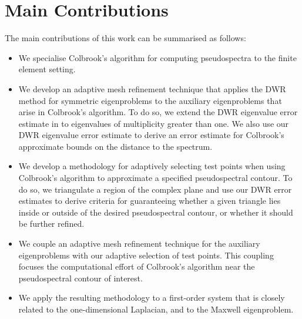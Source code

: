 \section{Main Contributions}

The main contributions of this work can be summarised as follows:

\begin{itemize}
    \item We specialise Colbrook's algorithm for computing pseudospectra to the finite element setting. 
    \item We develop an adaptive mesh refinement technique that applies the DWR method for symmetric eigenproblems to the auxiliary eigenproblems that arise in Colbrook's algorithm. To do so, we extend the  DWR eigenvalue error estimate in \cite{Bangerth, Heuveline} to eigenvalues of multiplicity greater than one.  We also use our DWR eigenvalue error estimate to derive an error estimate for Colbrook's approximate bounds on the distance to the spectrum.
    \item We develop a methodology for adaptively selecting test points when using Colbrook's algorithm to approximate a specified pseudospectral contour. To do so, we triangulate a region of the complex plane and use our DWR error estimates to derive criteria for guaranteeing whether a given triangle lies inside or outside of the desired pseudospectral contour, or whether it should be further refined.
    \item We couple an adaptive mesh refinement technique for the auxiliary eigenproblems with our adaptive selection of test points. This coupling focuses the computational effort of Colbrook's algorithm near the pseudospectral contour of interest. 
    \item We apply the resulting methodology to a first-order system that is closely related to the one-dimensional Laplacian, and to the Maxwell eigenproblem.
\end{itemize}


